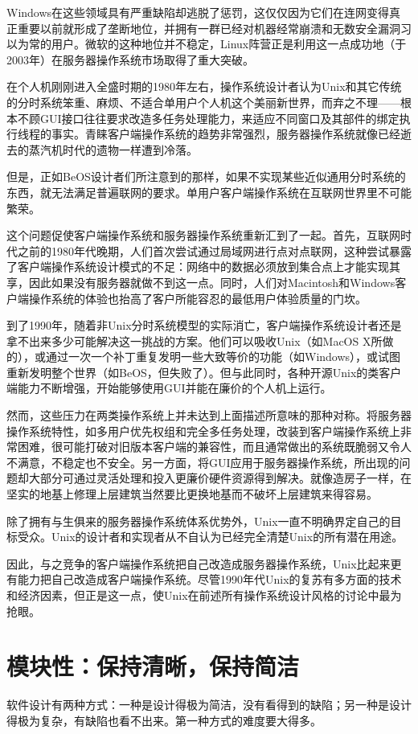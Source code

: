 \documentclass[11pt,oneside]{book}
\begin{document}
\begin{common-format}
Windows在这些领域具有严重缺陷却逃脱了惩罚，这仅仅因为它们在连网变得真正重要以前就形成了垄断地位，并拥有一群已经对机器经常崩溃和无数安全漏洞习以为常的用户。微软的这种地位并不稳定，Linux阵营正是利用这一点成功地（于2003年）在服务器操作系统市场取得了重大突破。

在个人机刚刚进入全盛时期的1980年左右，操作系统设计者认为Unix和其它传统的分时系统笨重、麻烦、不适合单用户个人机这个美丽新世界，而弃之不理——根本不顾GUI接口往往要求改造多任务处理能力，来适应不同窗口及其部件的绑定执行线程的事实。青睐客户端操作系统的趋势非常强烈，服务器操作系统就像已经逝去的蒸汽机时代的遗物一样遭到冷落。

但是，正如BeOS设计者们所注意到的那样，如果不实现某些近似通用分时系统的东西，就无法满足普遍联网的要求。单用户客户端操作系统在互联网世界里不可能繁荣。

这个问题促使客户端操作系统和服务器操作系统重新汇到了一起。首先，互联网时代之前的1980年代晚期，人们首次尝试通过局域网进行点对点联网，这种尝试暴露了客户端操作系统设计模式的不足：网络中的数据必须放到集合点上才能实现其享，因此如果没有服务器就做不到这一点。同时，人们对Macintosh和Windows客户端操作系统的体验也抬高了客户所能容忍的最低用户体验质量的门坎。

到了1990年，随着非Unix分时系统模型的实际消亡，客户端操作系统设计者还是拿不出来多少可能解决这一挑战的方案。他们可以吸收Unix（如MacOS X所做的），或通过一次一个补丁重复发明一些大致等价的功能（如Windows），或试图重新发明整个世界（如BeOS，但失败了）。但与此同时，各种开源Unix的类客户端能力不断增强，开始能够使用GUI并能在廉价的个人机上运行。

然而，这些压力在两类操作系统上并未达到上面描述所意味的那种对称。将服务器操作系统特性，如多用户优先权组和完全多任务处理，改装到客户端操作系统上非常困难，很可能打破对旧版本客户端的兼容性，而且通常做出的系统既脆弱又令人不满意，不稳定也不安全。另一方面，将GUI应用于服务器操作系统，所出现的问题却大部分可通过灵活处理和投入更廉价硬件资源得到解决。就像造房子一样，在坚实的地基上修理上层建筑当然要比更换地基而不破坏上层建筑来得容易。

除了拥有与生俱来的服务器操作系统体系优势外，Unix一直不明确界定自己的目标受众。Unix的设计者和实现者从不自认为已经完全清楚Unix的所有潜在用途。

因此，与之竞争的客户端操作系统把自己改造成服务器操作系统，Unix比起来更有能力把自己改造成客户端操作系统。尽管1990年代Unix的复苏有多方面的技术和经济因素，但正是这一点，使Unix在前述所有操作系统设计风格的讨论中最为抢眼。



\chapter{模块性：保持清晰，保持简洁}
\begin{flushright}
\begin{flashcard}[red!30]
软件设计有两种方式：一种是设计得极为简洁，没有看得到的缺陷；另一种是设计得极为复杂，有缺陷也看不出来。第一种方式的难度要大得多。


\end{flashcard}
\end{flushright}
\end{common-format}
\end{document}

